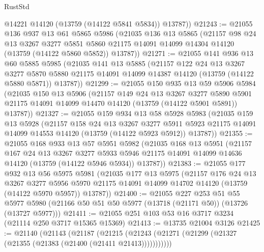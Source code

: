 \begin{lexlean}{RustStd}
\begin{coremodule}
        @14221
        @14120
        (@13759 (@14122 @5841 @5834))
        @13787))
@21243 := @21055
    @136
    @937
    @13
    @61
    @5865
    @5986
    (@21035
      @136
      @13
      @5865
      (@21157
        @98
        @24
        @13
        @3267
        @3277
        @5851
        @5860
        @21175
        @14091
        @14099
        @14304
        @14120
        (@13759 (@14122 @5860 @5852))
        @13787))
@21271 := @21055
    @141
    @936
    @13
    @60
    @5885
    @5985
    (@21035
      @141
      @13
      @5885
      (@21157
        @122
        @24
        @13
        @3267
        @3277
        @5870
        @5880
        @21175
        @14091
        @14099
        @14387
        @14120
        (@13759 (@14122 @5880 @5871))
        @13787))
@21299 := @21055
    @150
    @935
    @13
    @59
    @5906
    @5984
    (@21035
      @150
      @13
      @5906
      (@21157
        @149
        @24
        @13
        @3267
        @3277
        @5890
        @5901
        @21175
        @14091
        @14099
        @14470
        @14120
        (@13759 (@14122 @5901 @5891))
        @13787))
@21327 := @21055
    @159
    @934
    @13
    @58
    @5928
    @5983
    (@21035
      @159
      @13
      @5928
      (@21157
        @158
        @24
        @13
        @3267
        @3277
        @5911
        @5923
        @21175
        @14091
        @14099
        @14553
        @14120
        (@13759 (@14122 @5923 @5912))
        @13787))
@21355 := @21055
    @168
    @933
    @13
    @57
    @5951
    @5982
    (@21035
      @168
      @13
      @5951
      (@21157
        @167
        @24
        @13
        @3267
        @3277
        @5933
        @5946
        @21175
        @14091
        @14099
        @14636
        @14120
        (@13759 (@14122 @5946 @5934))
        @13787))
@21383 := @21055
    @177
    @932
    @13
    @56
    @5975
    @5981
    (@21035
      @177
      @13
      @5975
      (@21157
        @176
        @24
        @13
        @3267
        @3277
        @5956
        @5970
        @21175
        @14091
        @14099
        @14702
        @14120
        (@13759 (@14122 @5970 @5957))
        @13787))
@21400 := @21055
    @227
    @253
    @51
    @55
    @5977
    @5980
    (@21166 @50 @51 @50 @5977 (@13718 (@21171 @50)) (@13726 (@13727 @5977)))
@21411 := @21055 @251 @103 @53 @16 @3717 @3234 (@21114 @250 @3717 @15365 @15369)
@21413 := @13735 @21004 @3126
@21425 := @21140
    (@21143
      (@21187
        (@21215 (@21243 (@21271 (@21299 (@21327 (@21355 (@21383 (@21400 (@21411 @21413)))))))))))

\end{coremodule}
\end{lexlean}
